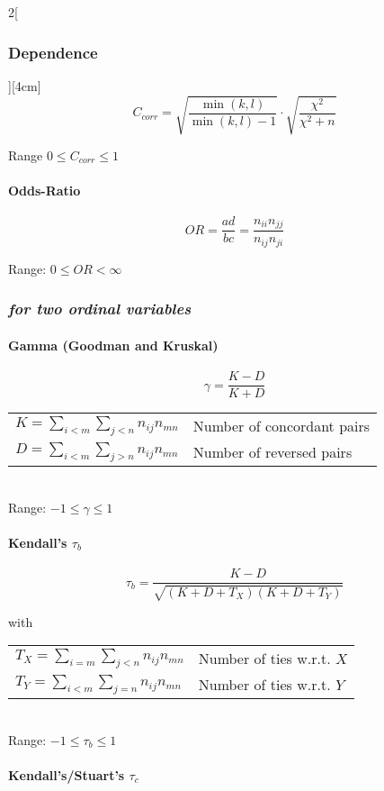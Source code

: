 \documentclass[8pt]{extarticle}
\begin{document}
\begin{multicols}{2}[\subsubsection{Dependence}][4cm]
$$C_{corr}= \sqrt{\frac{\min(k,l)}{\min(k,l)-1}} \cdot \sqrt{\frac{\chi^2}{\chi^2 + n}} $$

Range $ 0 \le C_{corr} \le 1 $

\paragraph{Odds-Ratio}

$$OR=\frac{ad}{bc} = \frac{n_{ii}n_{jj}}{n_{ij}n_{ji}}$$

Range: $0 \le OR < \infty$

\subsubsection*{\textit{for two ordinal variables}}

\paragraph{Gamma (Goodman and Kruskal)}

$$\gamma=\frac{K-D}{K+D}$$


\begin{tabular}{l l }
$ K=\sum_{i<m}\sum_{j<n}n_{ij}n_{mn}$ & Number of concordant pairs \\
$ D=\sum_{i<m}\sum_{j>n}n_{ij}n_{mn}$ & Number of reversed pairs \\
\end{tabular}

\ \\

Range: $-1 \le \gamma \le 1$

\paragraph{Kendall's $\tau_b$}

$$ \tau_b=\frac{K-D}{\sqrt{(K+D+T_X)(K+D+T_Y)}}$$

with

\begin{tabular}{l l } 
$ T_X=\sum_{i=m}\sum_{j<n}n_{ij}n_{mn}$ & Number of ties w.r.t. $X$ \\
$ T_Y=\sum_{i<m}\sum_{j=n}n_{ij}n_{mn}$ & Number of ties w.r.t. $Y$ \\
\end{tabular}

\ \\

Range: $-1 \le \tau_b \le 1$

\paragraph{Kendall's/Stuart's $\tau_c$}


\end{multicols}
\end{document}
